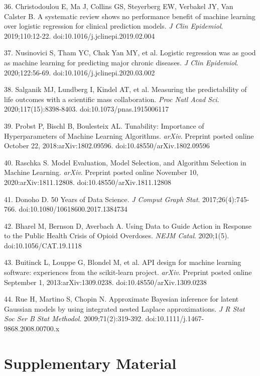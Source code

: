 36. Christodoulou E, Ma J, Collins GS, Steyerberg EW, Verbakel JY, Van Calster B. A systematic review shows no performance benefit of machine learning over logistic regression for clinical prediction models. \emph{J Clin Epidemiol}. 2019;110:12-22. doi:10.1016/j.jclinepi.2019.02.004

37. Nusinovici S, Tham YC, Chak Yan MY, et al. Logistic regression was as good as machine learning for predicting major chronic diseases. \emph{J Clin Epidemiol}. 2020;122:56-69. doi:10.1016/j.jclinepi.2020.03.002

38. Salganik MJ, Lundberg I, Kindel AT, et al. Measuring the predictability of life outcomes with a scientific mass collaboration. \emph{Proc Natl Acad Sci}. 2020;117(15):8398-8403. doi:10.1073/pnas.1915006117

39. Probst P, Bischl B, Boulesteix AL. Tunability: Importance of Hyperparameters of Machine Learning Algorithms. \emph{arXiv}. Preprint posted online October 22, 2018:arXiv:1802.09596. doi:10.48550/arXiv.1802.09596

40. Raschka S. Model Evaluation, Model Selection, and Algorithm Selection in Machine Learning. \emph{arXiv}. Preprint posted online November 10, 2020:arXiv:1811.12808. doi:10.48550/arXiv.1811.12808

41. Donoho D. 50 Years of Data Science. \emph{J Comput Graph Stat}. 2017;26(4):745-766. doi:10.1080/10618600.2017.1384734

42. Bharel M, Bernson D, Averbach A. Using Data to Guide Action in Response to the Public Health Crisis of Opioid Overdoses. \emph{NEJM Catal}. 2020;1(5). doi:10.1056/CAT.19.1118

43. Buitinck L, Louppe G, Blondel M, et al. API design for machine learning software: experiences from the scikit-learn project. \emph{arXiv}. Preprint posted online September 1, 2013:arXiv:1309.0238. doi:10.48550/arXiv.1309.0238

44. Rue H, Martino S, Chopin N. Approximate Bayesian inference for latent Gaussian models by using integrated nested Laplace approximations. \emph{J R Stat Soc Ser B Stat Methodol}. 2009;71(2):319-392. doi:10.1111/j.1467-9868.2008.00700.x

\subsubsection{\texorpdfstring{\hfill\break
}{ }}\label{section-1}

\section{Supplementary Material}\label{supplementary-material}

